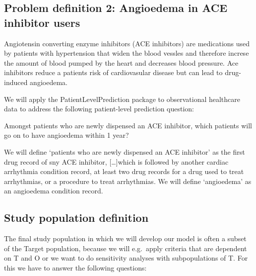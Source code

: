 \documentclass[
]{article}
\begin{document}
\hypertarget{problem-definition-2-angioedema-in-ace-inhibitor-users}{%
\subsection{Problem definition 2: Angioedema in ACE inhibitor
users}\label{problem-definition-2-angioedema-in-ace-inhibitor-users}}

Angiotensin converting enzyme inhibitors (ACE inhibitors) are
medications used by patients with hypertension that widen the blood
vessles and therefore increse the amount of blood pumped by the heart
and decreases blood pressure. Ace inhibitors reduce a patients risk of
cardiovasular disease but can lead to drug-induced angioedema.

We will apply the PatientLevelPrediction package to observational
healthcare data to address the following patient-level prediction
question:

Amongst patients who are newly dispensed an ACE inhibitor, which
patients will go on to have angioedema within 1 year?

We will define `patients who are newly dispensed an ACE inhibitor' as
the first drug record of sny ACE inhibitor, {[}\ldots{]}which is
followed by another cardiac arrhythmia condition record, at least two
drug records for a drug used to treat arrhythmias, or a procedure to
treat arrhythmias. We will define `angioedema' as an angioedema
condition record.

\hypertarget{study-population-definition}{%
\subsection{Study population
definition}\label{study-population-definition}}

The final study population in which we will develop our model is often a
subset of the Target population, because we will e.g.~apply criteria
that are dependent on T and O or we want to do sensitivity analyses with
subpopulations of T. For this we have to answer the following questions:
\end{document}
